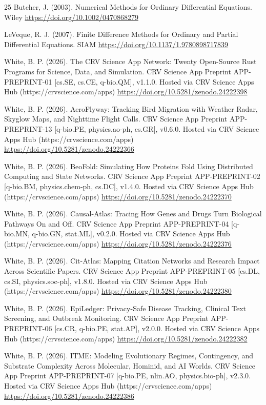 \documentclass[10pt,letterpaper]{article}
\begin{document}
\begin{thebibliography}{25}
 Butcher, J. (2003). Numerical Methods for Ordinary Differential Equations. Wiley \url{https://doi.org/10.1002/0470868279}

 LeVeque, R. J. (2007). Finite Difference Methods for Ordinary and Partial Differential Equations. SIAM \url{https://doi.org/10.1137/1.9780898717839}

 White, B. P. (2026). The CRV Science App Network: Twenty Open-Source Rust Programs for Science, Data, and Simulation. CRV Science App Preprint APP-PREPRINT-01 [cs.SE, cs.CE, q-bio.QM], v1.1.0. Hosted via CRV Science Apps Hub (https://crvscience.com/apps) \url{https://doi.org/10.5281/zenodo.24222398}

 White, B. P. (2026). AeroFlyway: Tracking Bird Migration with Weather Radar, Skyglow Maps, and Nighttime Flight Calls. CRV Science App Preprint APP-PREPRINT-13 [q-bio.PE, physics.ao-ph, cs.GR], v0.6.0. Hosted via CRV Science Apps Hub (https://crvscience.com/apps) \url{https://doi.org/10.5281/zenodo.24222366}

 White, B. P. (2026). BeoFold: Simulating How Proteins Fold Using Distributed Computing and State Networks. CRV Science App Preprint APP-PREPRINT-02 [q-bio.BM, physics.chem-ph, cs.DC], v1.4.0. Hosted via CRV Science Apps Hub (https://crvscience.com/apps) \url{https://doi.org/10.5281/zenodo.24222370}

 White, B. P. (2026). Causal-Atlas: Tracing How Genes and Drugs Turn Biological Pathways On and Off. CRV Science App Preprint APP-PREPRINT-04 [q-bio.MN, q-bio.GN, stat.ML], v0.2.0. Hosted via CRV Science Apps Hub (https://crvscience.com/apps) \url{https://doi.org/10.5281/zenodo.24222376}

 White, B. P. (2026). Cit-Atlas: Mapping Citation Networks and Research Impact Across Scientific Papers. CRV Science App Preprint APP-PREPRINT-05 [cs.DL, cs.SI, physics.soc-ph], v1.8.0. Hosted via CRV Science Apps Hub (https://crvscience.com/apps) \url{https://doi.org/10.5281/zenodo.24222380}

 White, B. P. (2026). EpiLedger: Privacy-Safe Disease Tracking, Clinical Text Screening, and Outbreak Monitoring. CRV Science App Preprint APP-PREPRINT-06 [cs.CR, q-bio.PE, stat.AP], v2.0.0. Hosted via CRV Science Apps Hub (https://crvscience.com/apps) \url{https://doi.org/10.5281/zenodo.24222382}

 White, B. P. (2026). ITME: Modeling Evolutionary Regimes, Contingency, and Substrate Complexity Across Molecular, Hominid, and AI Worlds. CRV Science App Preprint APP-PREPRINT-07 [q-bio.PE, nlin.AO, physics.bio-ph], v2.3.0. Hosted via CRV Science Apps Hub (https://crvscience.com/apps) \url{https://doi.org/10.5281/zenodo.24222386}


\end{thebibliography}
\end{document}
